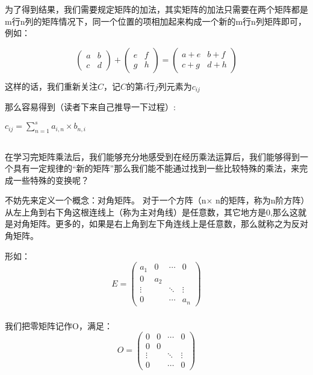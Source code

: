 \documentclass[12pt,a4paper]{book}
\begin{document}
为了得到结果，我们需要规定矩阵的加法，其实矩阵的加法只需要在两个矩阵都是m行n列的矩阵情况下，同一个位置的项相加起来构成一个新的m行n列矩阵即可，例如：

\[
\begin{pmatrix}
a&b\\
c&d
\end{pmatrix}
+
\begin{pmatrix}
e&f\\
g&h
\end{pmatrix}
=
\begin{pmatrix}
a+e&b+f\\
c+g&d+h
\end{pmatrix}
\]

$这样的话，我们重新关注C，记C的第i行j列元素为c_{ij}$

那么容易得到（读者下来自己推导一下过程）:
\begin{center}
$c_{ij}=\sum\limits_{n = 1}^{s}{a_{i,n} \times b_{n,i}}$
\end{center}

{\subsection{\centering\fontsize{20pt}{15pt}}}

{\subsubsection{\centering\fontsize{15pt}{15pt}}}
在学习完矩阵乘法后，我们能够充分地感受到在经历乘法运算后，我们能够得到一个具有一定规律的“新的矩阵”那么我们能不能通过找到一些比较特殊的乘法，来完成一些特殊的变换呢？

不妨先来定义一个概念：对角矩阵。
对于一个方阵（n$\times$ n的矩阵，称为n阶方阵）从左上角到右下角这根连线上（称为主对角线）是任意数，其它地方是0,那么这就是对角矩阵。更多的，如果是右上角到左下角连线上是任意数，那么就称之为反对角矩阵。

形如：
\[
E=
\begin{pmatrix}
a_1&0&\cdots&0\\
0&a_2&&\\
\vdots&&\ddots&\vdots\\
0&&\cdots&a_n
\end{pmatrix}
\]


{\subsubsection{\centering\fontsize{15pt}{15pt}}}
我们把零矩阵记作O，满足：
\[
O=
\begin{pmatrix}
0&0&\cdots&0\\
0&0&&\\
\vdots&&\ddots&\vdots\\
0&&\cdots&0
\end{pmatrix}
\]
\end{document}
